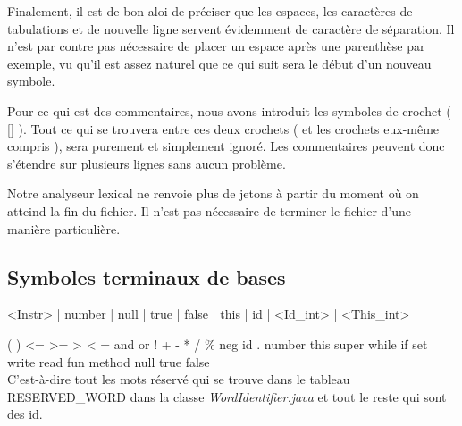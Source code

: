 Finalement, il est de bon aloi de préciser que les espaces, les caractères de tabulations et de nouvelle ligne servent évidemment de caractère de séparation. Il n'est par contre pas nécessaire de placer un espace après une parenthèse par exemple, vu qu'il est assez naturel que ce qui suit sera le début d'un nouveau symbole.

Pour ce qui est des commentaires, nous avons introduit les symboles de crochet ( [] ). Tout ce qui se trouvera entre ces deux crochets ( et les crochets eux-même compris ), sera purement et simplement ignoré. Les commentaires peuvent donc s'étendre sur plusieurs lignes sans aucun problème.

Notre analyseur lexical ne renvoie plus de jetons à partir du moment où on atteind la fin du fichier. Il n'est pas nécessaire de terminer le fichier d'une manière particulière.

\subsection{Symboles terminaux de bases}
<Instr>  | number | null | true | false | this | id | <Id\_int> | <This\_int>

( ) <= >= > < = and or ! + - * / \% neg id . number this super while if set write read fun method null true false \\
C'est-à-dire tout les mots réservé qui se trouve dans le tableau RESERVED\_WORD dans la classe \textit{WordIdentifier.java} et tout le reste qui sont
des id.

